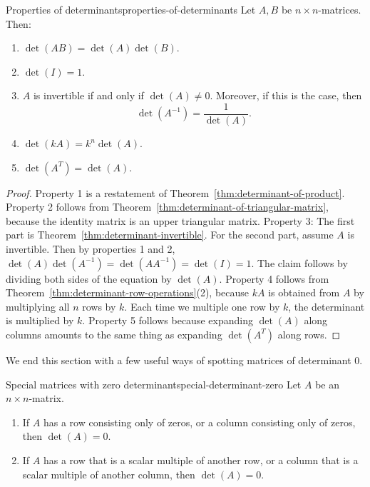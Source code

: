 \begin{theorem}{Properties of determinants}{properties-of-determinants}
  Let $A,B$ be $n\times n$-matrices. Then:%
  \begin{enumerate}
  \item $\det(AB)=\det(A)\det(B)$.
  \item $\det(I) = 1$.
  \item $A$ is invertible if and only if $\det(A)\neq 0$. Moreover, if
    this is the case, then
    \begin{equation*}
      \det(A^{-1}) = \frac{1}{\det(A)}.
    \end{equation*}
  \item $\det(kA)=k^n\det(A)$.
  \item $\det(A^T) = \det(A)$.
  \end{enumerate}
\end{theorem}

\begin{proof}
  Property 1 is a restatement of
  Theorem~\ref{thm:determinant-of-product}. Property 2 follows from
  Theorem~\ref{thm:determinant-of-triangular-matrix}, because the
  identity matrix is an upper triangular matrix. Property 3: The first
  part is Theorem~\ref{thm:determinant-invertible}. For the second
  part, assume $A$ is invertible. Then by properties 1 and 2,
  $\det(A)\det(A^{-1}) = \det(AA^{-1}) = \det(I) = 1$. The claim
  follows by dividing both sides of the equation by
  $\det(A)$. Property 4 follows from
  Theorem~\ref{thm:determinant-row-operations}(2), because $kA$ is
  obtained from $A$ by multiplying all $n$ rows by $k$. Each time we
  multiple one row by $k$, the determinant is multiplied by
  $k$. Property 5 follows because expanding $\det(A)$ along columns
  amounts to the same thing as expanding $\det(A^T)$ along rows.
\end{proof}

We end this section with a few useful ways of spotting matrices of
determinant 0.

\begin{theorem}{Special matrices with zero determinant}{special-determinant-zero}
  Let $A$ be an $n\times n$-matrix.
  \begin{enumerate}
  \item If $A$ has a row consisting only of zeros, or a column
    consisting only of zeros, then $\det(A)=0$.
  \item If $A$ has a row that is a scalar multiple of another row, or
    a column that is a scalar multiple of another column, then
    $\det(A)=0$.
  \end{enumerate}
\end{theorem}

